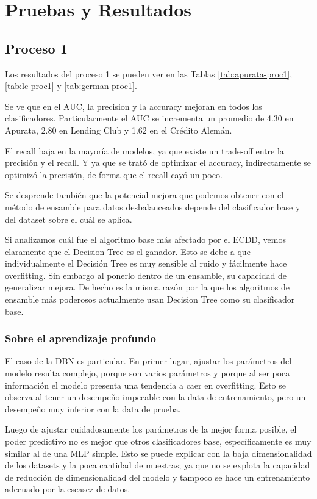\chapter{Pruebas y Resultados}

\section{Proceso 1} %

Los resultados del proceso 1 se pueden ver en las Tablas \ref{tab:apurata-proc1}, \ref{tab:lc-proc1} y \ref{tab:german-proc1}.

Se ve que en el AUC, la precision y la accuracy mejoran en todos los clasificadores. Particularmente el AUC se incrementa un promedio de 4.30 en Apurata, 2.80 en Lending Club y 1.62 en el Crédito Alemán.

El recall baja en la mayoría de modelos, ya que existe un trade-off entre la precisión y el recall. Y ya que se trató de optimizar el accuracy, indirectamente se optimizó la precisión, de forma que el recall cayó un poco.

Se desprende también que la potencial mejora que podemos obtener con el método de ensamble para datos desbalanceados depende del clasificador base y del dataset sobre el cuál se aplica. 

Si analizamos cuál fue el algoritmo base más afectado por el \ac{ECDD}, vemos claramente que el Decision Tree es el ganador. Esto se debe a que individualmente el Decisión Tree es muy sensible al ruido y fácilmente hace overfitting. Sin embargo al ponerlo dentro de un ensamble, su capacidad de generalizar mejora. De hecho es la misma razón por la que los algoritmos de ensamble más poderosos actualmente usan Decision Tree como su clasificador base.

\subsection{Sobre el aprendizaje profundo}

El caso de la \ac{DBN} es particular. En primer lugar, ajustar los parámetros del modelo resulta complejo, porque son varios parámetros y porque al ser poca información el modelo presenta una tendencia a caer en overfitting. Esto se observa al tener un desempeño impecable con la data de entrenamiento, pero un desempeño muy inferior con la data de prueba.

Luego de ajustar cuidadosamente los parámetros de la mejor forma posible, el poder predictivo no es mejor que otros clasificadores base, específicamente es muy similar al de una \ac{MLP} simple. Esto se puede explicar con la baja dimensionalidad de los datasets y la poca cantidad de muestras; ya que no se explota la capacidad de reducción de dimensionalidad del modelo y tampoco se hace un entrenamiento adecuado por la escasez de datos.

